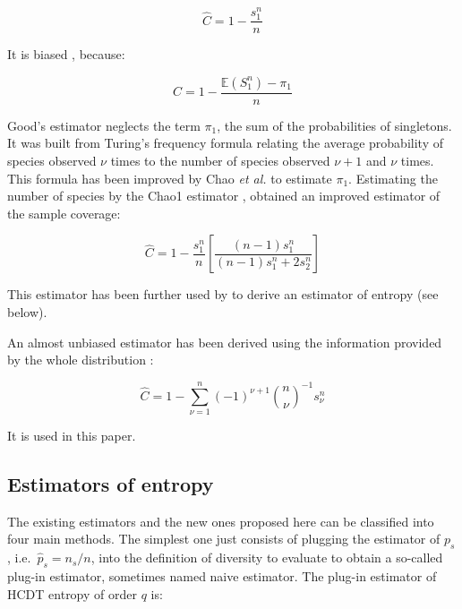 \documentclass[fleqn,10pt]{latex/stylish_article} %
\begin{document}
\begin{equation}
    \hat{C} = 1-\frac{{s}^{n}_{1}}{n}
  \label{eq:CGood}
\end{equation}

It is biased \citep{Zhang2007}, because:

\begin{equation}
  C = 1-\frac{{\mathbb E}({S}^{n}_{1}) - \pi_1}{n}
  \label{eq:CsansBiais}
\end{equation}

Good's estimator neglects the term \(\pi_1\), the sum of the probabilities of singletons.
It was built from Turing's frequency formula relating the average probability of species observed \(\nu\) times to the number of species observed \(\nu+1\) and \(\nu\) times.
This formula has been improved by Chao \emph{et al.} \citep{Chao2010a, Chiu2014a} to estimate \(\pi_1\).
Estimating the number of species by the Chao1 estimator \citep{Chao1984}, \citet{Chao2010a} obtained an improved estimator of the sample coverage:

\begin{equation} 
    \hat{C} = 1-\frac{{s}^{n}_{1}}{n}\left[\frac{\left(n-1\right){s}^{n}_{1}}{\left(n-1\right){s}^{n}_{1}+2{s}^{n}_{2}{}}\right]
  \label{eq:CChao}
\end{equation}

This estimator has been further used by \citet{Chao2015} to derive an estimator of entropy (see below).

An almost unbiased estimator has been derived using the information provided by the whole distribution \citep{Chao1988, Zhang2007}:

\begin{equation}
  \hat{C}=1-\sum^{n}_{\nu=1}{\left(-1\right)}^{\nu+1}{\binom{n}{\nu}}^{-1}{s}^{n}_{\nu}
  \label{eq:CZhang}
\end{equation}

It is used in this paper.

\hypertarget{estimators-of-entropy}{%
\subsection{Estimators of entropy}\label{estimators-of-entropy}}

The existing estimators and the new ones proposed here can be classified into four main methods.
The simplest one just consists of plugging the estimator of \(p_s\), i.e.~\(\hat{p}_s = n_s/n\), into the definition of diversity to evaluate to obtain a so-called plug-in estimator, sometimes named naive estimator.
The plug-in estimator of HCDT entropy of order \(q\) is:
\end{document}
